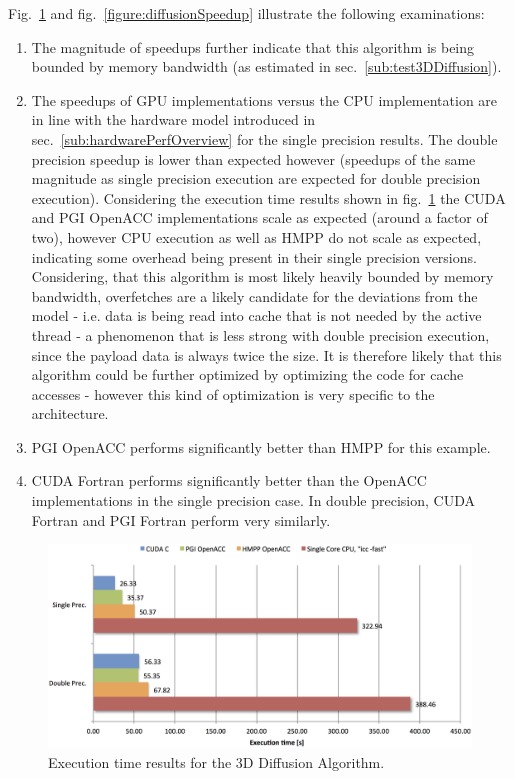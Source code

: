 Fig.~\ref{figure:diffusionExecTime} and fig.~\ref{figure:diffusionSpeedup} illustrate the following examinations: 

\begin{enumerate}
 \item The magnitude of speedups further indicate that this algorithm is being bounded by memory bandwidth (as estimated in sec.~\ref{sub:test3DDiffusion}).
 \item The speedups of GPU implementations versus the CPU implementation are in line with the hardware model introduced in sec.~\ref{sub:hardwarePerfOverview} for the single precision results. The double precision speedup is lower than expected however (speedups of the same magnitude as single precision execution are expected for double precision execution). Considering the execution time results shown in fig.~\ref{figure:diffusionExecTime} the CUDA and PGI OpenACC implementations scale as expected (around a factor of two), however CPU execution as well as HMPP do not scale as expected, indicating some overhead being present in their single precision versions. Considering, that this algorithm is most likely heavily bounded by memory bandwidth, overfetches are a likely candidate for the deviations from the model - i.e. data is being read into cache that is not needed by the active thread - a phenomenon that is less strong with double precision execution, since the payload data is always twice the size. It is 
therefore likely that this 
algorithm could be further optimized by optimizing the code for cache accesses - however this kind of optimization is very specific to the architecture. 
 \item PGI OpenACC performs significantly better than HMPP for this example. 
 \item CUDA Fortran performs significantly better than the OpenACC implementations in the single precision case. In double precision, CUDA Fortran and PGI Fortran perform very similarly.
\end{enumerate}

\begin{figure}[htpb]
	\centering
	\includegraphics[width=14cm]{figures/diffusionExecTimeResults}
	\caption[Execution Time Results for 3D Diffusion]{Execution time results for the 3D Diffusion Algorithm.}
	\label{figure:diffusionExecTime}
\end{figure}

